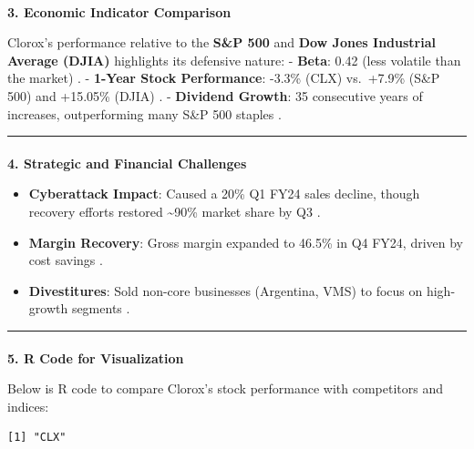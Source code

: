 \documentclass[
  letterpaper,
  DIV=11,
  numbers=noendperiod]{scrartcl}
\makeatletter
\let\oldparagraph\paragraph
\renewcommand{\paragraph}{
    \@ifstar
      \xxxParagraphStar
      \xxxParagraphNoStar
  }
\newcommand{\xxxParagraphStar}[1]{\oldparagraph*{#1}\mbox{}}
\newcommand{\xxxParagraphNoStar}[1]{\oldparagraph{#1}\mbox{}}
\providecommand{\tightlist}{%
  \setlength{\itemsep}{0pt}\setlength{\parskip}{0pt}}\usepackage{longtable,booktabs,array}
\makeatother
\begin{document}
\paragraph{\texorpdfstring{\textbf{3. Economic Indicator
Comparison}}{3. Economic Indicator Comparison}}\label{economic-indicator-comparison}

Clorox's performance relative to the \textbf{S\&P 500} and \textbf{Dow
Jones Industrial Average (DJIA)} highlights its defensive nature: -
\textbf{Beta}: 0.42 (less volatile than the market) . - \textbf{1-Year
Stock Performance}: -3.3\% (CLX) vs.~+7.9\% (S\&P 500) and +15.05\%
(DJIA) . - \textbf{Dividend Growth}: 35 consecutive years of increases,
outperforming many S\&P 500 staples .

\begin{center}\rule{0.5\linewidth}{0.5pt}\end{center}

\paragraph{\texorpdfstring{\textbf{4. Strategic and Financial
Challenges}}{4. Strategic and Financial Challenges}}\label{strategic-and-financial-challenges}

\begin{itemize}
\tightlist
\item
  \textbf{Cyberattack Impact}: Caused a 20\% Q1 FY24 sales decline,
  though recovery efforts restored \textasciitilde90\% market share by
  Q3 .
\item
  \textbf{Margin Recovery}: Gross margin expanded to 46.5\% in Q4 FY24,
  driven by cost savings .
\item
  \textbf{Divestitures}: Sold non-core businesses (Argentina, VMS) to
  focus on high-growth segments .
\end{itemize}

\begin{center}\rule{0.5\linewidth}{0.5pt}\end{center}

\paragraph{\texorpdfstring{\textbf{5. R Code for
Visualization}}{5. R Code for Visualization}}\label{r-code-for-visualization}

Below is R code to compare Clorox's stock performance with competitors
and indices:

\begin{verbatim}
[1] "CLX"
\end{verbatim}
\end{document}
